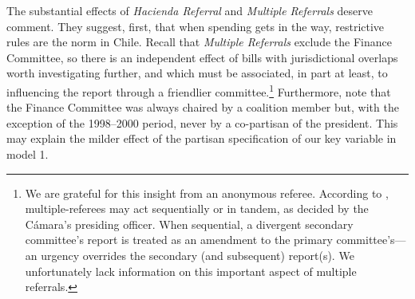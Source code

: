 \documentclass[letter,12pt]{article}
\begin{document}
The substantial effects of \emph{Hacienda Referral} and \emph{Multiple Referrals} deserve comment. They suggest, first, that when spending gets in the way, restrictive rules are the norm in Chile. Recall that \emph{Multiple Referrals} exclude the Finance Committee, so there is an independent effect of bills with jurisdictional overlaps worth investigating further, and which must be associated, in part at least, to influencing the report through a friendlier committee.\footnote{We are grateful for this insight from an anonymous referee. According to \citet[][, 118]{sotoCongChile2015}, multiple-referees may act sequentially or in tandem, as decided by the Cámara's presiding officer. When sequential, a divergent secondary committee's report is treated as an amendment to the primary committee's---an urgency overrides the secondary (and subsequent) report(s). We unfortunately lack information on this important aspect of multiple referrals.} Furthermore, note that the Finance Committee was always chaired by a coalition member but, with the exception of the 1998--2000 period, never by a co-partisan of the president. This may explain the milder effect of the partisan specification of our key variable in model 1. 


\end{document}
